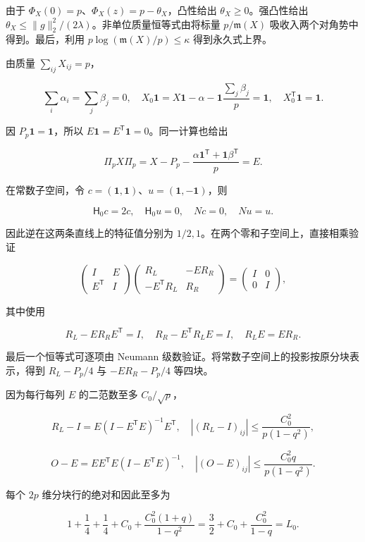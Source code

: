 \documentclass[11pt,a4paper]{article}
\begin{document}
由于 \(\Phi_X(0)=p\)、\(\Phi_X(z)=p-\theta_X\)，凸性给出 \(\theta_X\ge0\)。强凸性给出 \(\theta_X\le\|g\|_2^2/(2\lambda)\)。非单位质量恒等式由将标量 \(p/\mathfrak m(X)\) 吸收入两个对角势中得到。最后，利用 \(p\log(\mathfrak m(X)/p)\le\kappa\) 得到永久式上界。

由质量 \(\sum_{ij}X_{ij}=p\)，

\[
\sum_i\alpha_i=\sum_j\beta_j=0,
\quad X_0\mathbf1=X\mathbf1-\alpha-\mathbf1\frac{\sum_j\beta_j}p=\mathbf1,
\quad X_0^{\mathsf T}\mathbf1=\mathbf1.
\]

因 \(P_p\mathbf1=\mathbf1\)，所以 \(E\mathbf1=E^{\mathsf T}\mathbf1=0\)。同一计算也给出

\[
\Pi_pX\Pi_p=X-P_p-\frac{\alpha\mathbf1^{\mathsf T}+\mathbf1\beta^{\mathsf T}}p=E.
\]

在常数子空间，令 \(c=(\mathbf1,\mathbf1)\)、\(u=(\mathbf1,-\mathbf1)\)，则

\[
\mathsf H_0c=2c,\quad\mathsf H_0u=0,\quad Nc=0,\quad Nu=u.
\]

因此逆在这两条直线上的特征值分别为 \(1/2,1\)。在两个零和子空间上，直接相乘验证

\[
\begin{pmatrix}I&E\\E^{\mathsf T}&I\end{pmatrix}
\begin{pmatrix}R_L&-ER_R\\-E^{\mathsf T}R_L&R_R\end{pmatrix}
=\begin{pmatrix}I&0\\0&I\end{pmatrix},
\]

其中使用

\[
R_L-ER_RE^{\mathsf T}=I,\quad R_R-E^{\mathsf T}R_LE=I,
\quad R_LE=ER_R.
\]

最后一个恒等式可逐项由 Neumann 级数验证。将常数子空间上的投影按原分块表示，得到 \(R_L-P_p/4\) 与 \(-ER_R-P_p/4\) 等四块。

因为每行每列 \(E\) 的二范数至多 \(C_0/\sqrt p\)，

\[
R_L-I=E(I-E^{\mathsf T}E)^{-1}E^{\mathsf T},
\quad |(R_L-I)_{ij}|\le\frac{C_0^2}{p(1-q^2)},
\]

\[
O-E=EE^{\mathsf T}E(I-E^{\mathsf T}E)^{-1},
\quad |(O-E)_{ij}|\le\frac{C_0^2q}{p(1-q^2)}.
\]

每个 \(2p\) 维分块行的绝对和因此至多为

\[
1+\frac14+\frac14+C_0+
\frac{C_0^2(1+q)}{1-q^2}
=\frac32+C_0+\frac{C_0^2}{1-q}=L_0.
\]
\end{document}
